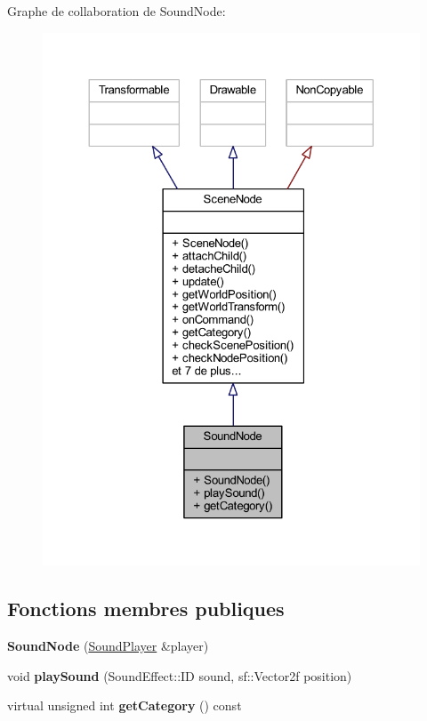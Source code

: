 Graphe de collaboration de Sound\+Node\+:\nopagebreak
\begin{figure}[H]
\begin{center}
\leavevmode
\includegraphics[width=324pt]{class_sound_node__coll__graph}
\end{center}
\end{figure}
\subsection*{Fonctions membres publiques}
\begin{DoxyCompactItemize}
\item 
\hypertarget{class_sound_node_a374cff296ed78406c03103f843f544b3}{}\label{class_sound_node_a374cff296ed78406c03103f843f544b3} 
{\bfseries Sound\+Node} (\hyperlink{class_sound_player}{Sound\+Player} \&player)
\item 
\hypertarget{class_sound_node_a596804942f356e61ec845c9310c42b8d}{}\label{class_sound_node_a596804942f356e61ec845c9310c42b8d} 
void {\bfseries play\+Sound} (Sound\+Effect\+::\+ID sound, sf\+::\+Vector2f position)
\item 
\hypertarget{class_sound_node_a2d41acd2e32af8f4a020a1604cfc5ff6}{}\label{class_sound_node_a2d41acd2e32af8f4a020a1604cfc5ff6} 
virtual unsigned int {\bfseries get\+Category} () const
\end{DoxyCompactItemize}
